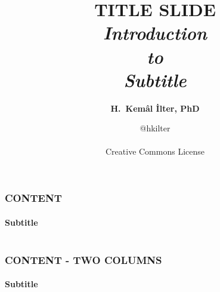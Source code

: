 \documentclass[14 pt]{beamer}
\title[Short-title]{TITLE SLIDE\\ \vskip1cm \fontspec{Crimson Text}
\textit{Introduction\\to\\Subtitle}}
\date[ilter-desc]{@hkilter\\ \vskip4cm \ccbyncnd \\ Creative Commons License}
\author[ilter]{\textbf{H.~Kem\^al İlter, PhD}}
\begin{document}

%
%


\begin{frame}
\titlepage
\end{frame}


\begin{frame}[t]
\frametitle{CONTENT}
\framesubtitle{Subtitle}

\begin{columns}[t]
\begin{column}{0.96\textwidth}
\lipsum[1]
\vskip0.5cm%
\lipsum[2]
\end{column}
\end{columns}
\end{frame}


\begin{frame}[t]
\frametitle{CONTENT - TWO COLUMNS}
\framesubtitle{Subtitle}
\begin{columns}[t]
\begin{column}{0.45\textwidth}
\lipsum[3]
\vskip0.5cm%
\lipsum[4]
\end{column}
\begin{column}{0.45\textwidth}
\lipsum[5]
\vskip0.5cm%
\lipsum[6]
\end{column}
\end{columns}
\end{frame}

\end{document}
